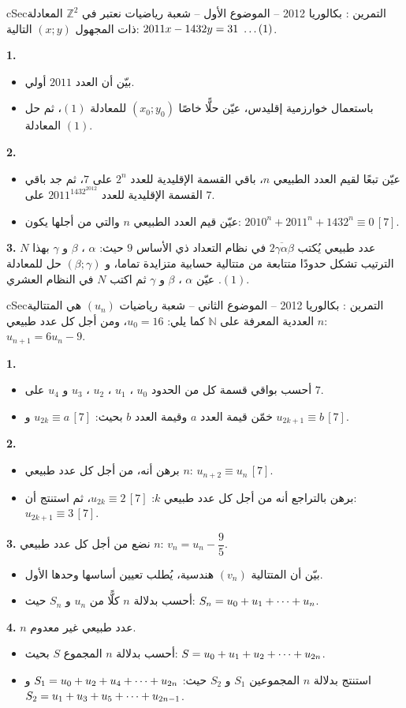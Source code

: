 \documentclass[12pt,a4paper]{article}
\newenvironment{BOX}[2]{\begin{otherlanguage}{english}\begin{arbox}{#1}{#2}}{\end{arbox}\end{otherlanguage}}
\newcounter{exo}
\newenvironment{tamrin}[1]{\stepcounter{exo}\begin{BOX}{cSec}{التمرين \theexo: #1}}{\end{BOX}}
\renewcommand{\ldots}{\mathinner{\ldotp\ldotp\ldotp}}
\renewcommand{\cdots}{\mathinner{\cdotp\cdotp\cdotp}}
\newcommand{\N}{\mathbb{N}}
\newcommand{\Z}{\mathbb{Z}}
\newenvironment{sq}{\begin{itemize}[leftmargin=2.4em,itemsep=3pt]}{\end{itemize}}
\newcommand{\qa}{\item[(أ)]}\newcommand{\qb}{\item[(ب)]}\newcommand{\qc}{\item[(جـ)]}\newcommand{\qd}{\item[(د)]}\newcommand{\qe}{\item[(هـ)]}
\begin{document}
\begin{tamrin}{بكالوريا 2012 -- الموضوع الأول -- شعبة رياضيات}
نعتبر في $\Z^2$ المعادلة ذات المجهول $(x;y)$ التالية: $2011x-1432y=31\ \ldots(1)$.

\textbf{1.}
\begin{sq}
\qa بيّن أن العدد $2011$ أولي.
\qb باستعمال خوارزمية إقليدس، عيّن حلًّا خاصًا $(x_0;y_0)$ للمعادلة $(1)$، ثم حل المعادلة $(1)$.
\end{sq}
\textbf{2.}
\begin{sq}
\qa عيّن تبعًا لقيم العدد الطبيعي $n$، باقي القسمة الإقليدية للعدد $2^n$ على $7$، ثم جد باقي القسمة الإقليدية للعدد $2011^{1432^{2012}}$ على $7$.
\qb عيّن قيم العدد الطبيعي $n$ والتي من أجلها يكون: $2010^n+2011^n+1432^n\equiv0\,[7]$.
\end{sq}
\textbf{3.} $N$ عدد طبيعي يُكتب $\overline{2\gamma\alpha\beta}$ في نظام التعداد ذي الأساس $9$ حيث: $\alpha$ ، $\beta$ و $\gamma$ بهذا الترتيب تشكل حدودًا متتابعة من متتالية حسابية متزايدة تماما، و $(\beta;\gamma)$ حل للمعادلة $(1)$.
عيّن $\alpha$ ، $\beta$ و $\gamma$ ثم اكتب $N$ في النظام العشري.
\end{tamrin}

\begin{tamrin}{بكالوريا 2012 -- الموضوع الثاني -- شعبة رياضيات}
$(u_n)$ هي المتتالية العددية المعرفة على $\N$ كما يلي: $u_0=16$، ومن أجل كل عدد طبيعي $n$: $u_{n+1}=6u_n-9$.

\textbf{1.}
\begin{sq}
\qa أحسب بواقي قسمة كل من الحدود $u_0$ ، $u_1$ ، $u_2$ ، $u_3$ و $u_4$ على $7$.
\qb خمّن قيمة العدد $a$ وقيمة العدد $b$ بحيث: $u_{2k}\equiv a\,[7]$ و $u_{2k+1}\equiv b\,[7]$.
\end{sq}
\textbf{2.}
\begin{sq}
\qa برهن أنه، من أجل كل عدد طبيعي $n$: $u_{n+2}\equiv u_n\,[7]$.
\qb برهن بالتراجع أنه من أجل كل عدد طبيعي $k$: $u_{2k}\equiv2\,[7]$، ثم استنتج أن: $u_{2k+1}\equiv3\,[7]$.
\end{sq}
\textbf{3.} نضع من أجل كل عدد طبيعي $n$: $v_n=u_n-\dfrac95$.
\begin{sq}
\qa بيّن أن المتتالية $(v_n)$ هندسية، يُطلب تعيين أساسها وحدها الأول.
\qb أحسب بدلالة $n$ كلًّا من $u_n$ و $S_n$ حيث: $S_n=u_0+u_1+\cdots+u_n$.
\end{sq}
\textbf{4.} $n$ عدد طبيعي غير معدوم.
\begin{sq}
\qa أحسب بدلالة $n$ المجموع $S$ بحيث: $S=u_0+u_1+u_2+\cdots+u_{2n}$.
\qb استنتج بدلالة $n$ المجموعين $S_1$ و $S_2$ حيث: $S_1=u_0+u_2+u_4+\cdots+u_{2n}$ و $S_2=u_1+u_3+u_5+\cdots+u_{2n-1}$.
\end{sq}
\end{tamrin}
\end{document}
